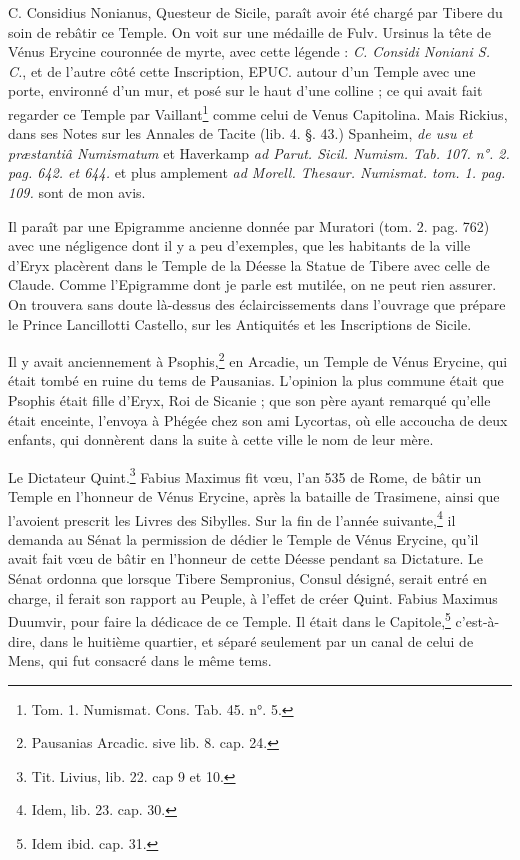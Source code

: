 \documentclass[a4paper, 11pt, oneside, polutonikogreek, french]{article}
\begin{document}
C. Considius Nonianus, Questeur de Sicile, paraît avoir été chargé par Tibere du soin de rebâtir ce Temple. On voit sur une médaille de Fulv. Ursinus la tête de Vénus Erycine couronnée de myrte, avec cette légende : \emph{C. Considi Noniani S. C.}, et de l'autre côté cette Inscription, EPUC. autour d'un Temple avec une porte, environné d'un mur, et posé sur le haut d'une colline ; ce qui avait fait regarder ce Temple par Vaillant\footnote{Tom. 1. Numismat. Cons. Tab. 45. n°. 5.} comme celui de Venus Capitolina. Mais Rickius, dans ses Notes sur les Annales de Tacite (lib. 4. §. 43.) Spanheim, \emph{de usu et præstantiâ Numismatum} et Haverkamp \emph{ad Parut. Sicil. Numism. Tab. 107. n°. 2. pag. 642. et 644.} et plus amplement \emph{ad Morell. Thesaur. Numismat. tom. 1. pag. 109.} sont de mon avis.

Il paraît par une Epigramme ancienne donnée par Muratori (tom. 2. pag. 762) avec une négligence dont il y a peu d'exemples, que les habitants de la ville d'Eryx placèrent dans le Temple de la Déesse la Statue de Tibere avec celle de Claude. Comme l'Epigramme dont je parle est mutilée, on ne peut rien assurer. On trouvera sans doute là-dessus des éclaircissements dans l'ouvrage que prépare le Prince Lancillotti Castello, sur les Antiquités et les Inscriptions de Sicile.

Il y avait anciennement à Psophis,\footnote{Pausanias Arcadic. sive lib. 8. cap. 24.} en Arcadie, un Temple de Vénus Erycine, qui était tombé en ruine du tems de Pausanias. L'opinion la plus commune était que Psophis était fille d'Eryx, Roi de Sicanie ; que son père ayant remarqué qu'elle était enceinte, l'envoya à Phégée chez son ami Lycortas, où elle accoucha de deux enfants, qui donnèrent dans la suite à cette ville le nom de leur mère.

Le Dictateur Quint.\footnote{Tit. Livius, lib. 22. cap 9 et 10.} Fabius Maximus fit vœu, l'an 535 de Rome, de bâtir un Temple en l'honneur de Vénus Erycine, après la bataille de Trasimene, ainsi que l'avoient prescrit les Livres des Sibylles. Sur la fin de l'année suivante,\footnote{Idem, lib. 23. cap. 30.} il demanda au Sénat la permission de dédier le Temple de Vénus Erycine, qu'il avait fait vœu de bâtir en l'honneur de cette Déesse pendant sa Dictature. Le Sénat ordonna que lorsque Tibere Sempronius, Consul désigné, serait entré en charge, il ferait son rapport au Peuple, à l'effet de créer Quint. Fabius Maximus Duumvir, pour faire la dédicace de ce Temple. Il était dans le Capitole,\footnote{Idem ibid. cap. 31.} c'est-à-dire, dans le huitième quartier, et séparé seulement par un canal de celui de Mens, qui fut consacré dans le même tems.
\end{document}
